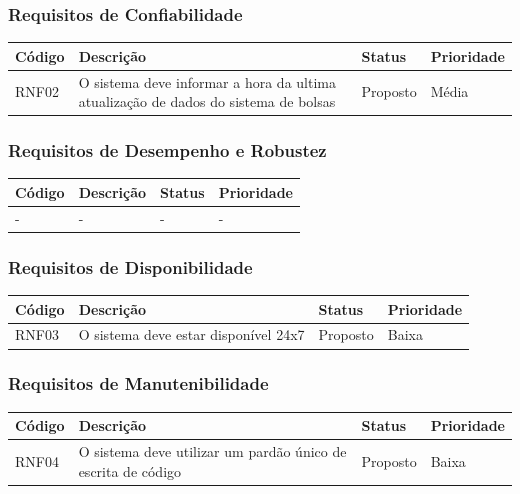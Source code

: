 \documentclass[a4paper, 12pt]{article}
\begin{document}
\subsubsection{Requisitos de Confiabilidade}
\begin{table}[ht]
	\centering

	\begin{tabular}{p{2cm}p{7cm}p{2cm}p{2cm}}
		\hline
		\cellcolor{gray}Código&\cellcolor{gray}Descrição&\cellcolor{gray}Status&\cellcolor{gray}Prioridade  \\
		\hline
        RNF02&O sistema deve informar a hora da ultima atualiza\c{c}\~{a}o de dados do sistema de bolsas&Proposto&M\'{e}dia\\
		\hline
	\end{tabular}
\end{table}%
\subsubsection{Requisitos de Desempenho e Robustez}
\begin{table}[ht]
	\rowcolors{1}{}{}
	\centering

	\begin{tabular}{p{2cm}p{7cm}p{2cm}p{2cm}}
		\hline
		\cellcolor{gray}Código&\cellcolor{gray}Descrição&\cellcolor{gray}Status&\cellcolor{gray}Prioridade  \\
		\hline
		-&-&-&-\\
		\hline
	\end{tabular}
\end{table}
\newpage
\subsubsection{Requisitos de Disponibilidade}
\begin{table}[ht]
	\centering

	\begin{tabular}{p{2cm}p{7cm}p{2cm}p{2cm}}
		\hline
		\cellcolor{gray}Código&\cellcolor{gray}Descrição&\cellcolor{gray}Status&\cellcolor{gray}Prioridade  \\
		\hline
		RNF03&O sistema deve estar dispon\'{i}vel 24x7&Proposto&Baixa\\
		\hline
	\end{tabular}
\end{table}
\subsubsection{Requisitos de Manutenibilidade}
\begin{table}[ht]
	\centering

	\begin{tabular}{p{2cm}p{7cm}p{2cm}p{2cm}}
		\hline
		\cellcolor{gray}Código&\cellcolor{gray}Descrição&\cellcolor{gray}Status&\cellcolor{gray}Prioridade  \\
		\hline
		RNF04&O sistema deve utilizar um pard\~{a}o \'{u}nico de escrita de c\'{o}digo&Proposto&Baixa\\
		\hline
	\end{tabular}
\end{table}%
\end{document}
